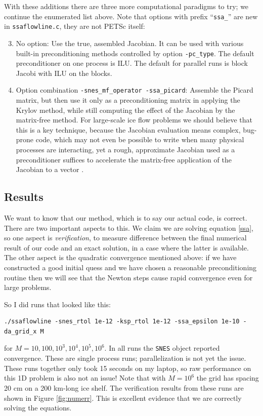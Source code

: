 \documentclass[11pt,final,reqno]{amsart}
\begin{document}
With these additions there are three more computational paradigms to try; we continue the enumerated list above.  Note that options with prefix ``\texttt{ssa\_}'' are new in \texttt{ssaflowline.c}, they are not  PETSc itself:
\begin{enumerate}
\setcounter{enumi}{2}
\item No option:  Use the true, assembled Jacobian.  It can be used with various built-in preconditioning methods controlled by option \texttt{-pc\_type}.  The default preconditioner on one process is ILU.  The default for parallel runs is block Jacobi with ILU on the blocks.
\item Option combination \texttt{-snes\_mf\_operator -ssa\_picard}:  Assemble the Picard matrix, but then use it only as a preconditioning matrix in applying the Krylov method, while still computing the effect of the Jacobian by the matrix-free method.  For large-scale ice flow problems we should believe that this is a key technique, because the Jacobian evaluation means complex, bug-prone code, which may not even be possible to write when many physical processes are interacting, yet a rough, approximate Jacobian used as a preconditioner suffices to accelerate the matrix-free application of the Jacobian to a vector \cite{KnollKeyes2004}.
\end{enumerate}


\subsection*{Results}  We want to know that our method, which is to say our actual code, is correct.  There are two important aspects to this.  We claim we are solving equation \eqref{ssa}, so one aspect is \emph{verification}, to measure difference between the final numerical result of our code and an exact solution, in a case where the latter is available.  The other aspect is the quadratic convergence mentioned above: if we have constructed a good initial quess and we have chosen a reasonable preconditioning routine then we will see that the Newton steps cause rapid convergence even for large problems.

So I did runs that looked like this:
\begin{Verbatim}
./ssaflowline -snes_rtol 1e-12 -ksp_rtol 1e-12 -ssa_epsilon 1e-10 -da_grid_x M
\end{Verbatim}
for $M=10,100,10^3,10^4,10^5,10^6$.  In all runs the \texttt{SNES} object reported convergence.  These are single process runs; parallelization is not yet the issue.  These runs together only took 15 seconds on my laptop, so raw performance on this 1D problem is also not an issue!  Note that with $M=10^6$ the grid has spacing 20 cm on a 200 km-long ice shelf.  The verification results from these runs are shown in Figure \ref{fig:numerr}.  This is excellent evidence that we are correctly solving the equations.
\end{document}
